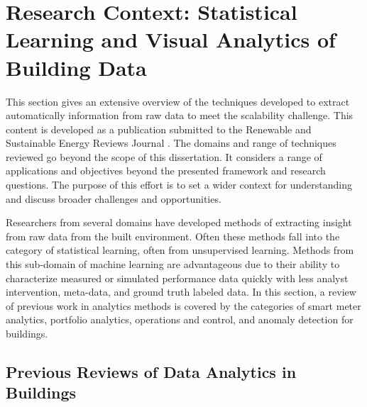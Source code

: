 \chapter{Research Context: Statistical Learning and Visual Analytics of Building Data}
\label{sec:litreview}

This section gives an extensive overview of the techniques developed to extract automatically information from raw data to meet the scalability challenge. This content is developed as a publication submitted to the Renewable and Sustainable Energy Reviews Journal \citep{miller_review_????}. The domains and range of techniques reviewed go beyond the scope of this dissertation. It considers a range of applications and objectives beyond the presented framework and research questions. The purpose of this effort is to set a wider context for understanding and discuss broader challenges and opportunities.

Researchers from several domains have developed methods of extracting insight from raw data from the built environment. Often these methods fall into the category of statistical learning, often from unsupervised learning. Methods from this sub-domain of machine learning are advantageous due to their ability to characterize measured or simulated performance data quickly with less analyst intervention, meta-data, and ground truth labeled data. In this section, a review of previous work in analytics methods is covered by the categories of smart meter analytics, portfolio analytics, operations and control, and anomaly detection for buildings.

\section{Previous Reviews of Data Analytics in Buildings}
\label{sec:previousreviews}

